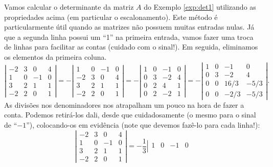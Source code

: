 \documentclass[../livro.tex]{subfiles}  %
\begin{document}
\begin{example}
Vamos calcular o determinante da matriz $A$ do Exemplo \ref{exp:det1} utilizando as propriedades acima (em particular o escalonamento). Este método é particularmente útil quando as matrizes não possuem muitas entradas nulas. Já que a segunda linha possui um ``1'' na primeira entrada, vamos fazer uma troca de linhas para facilitar as contas (cuidado com o sinal!). Em seguida, eliminamos os elementos da primeira coluna.
\begin{equation}
\left| \begin{matrix}
-2 & 3 & 0  & 4 \\
1  & 0 & -1 & 0 \\
3  & 2 & 1  & 1 \\
-2 & 2 & 0  & 1
\end{matrix}
\right| = -
\left| \begin{matrix}
1  & 0 & -1 & 0 \\
-2 & 3 & 0  & 4 \\
3  & 2 & 1  & 1 \\
-2 & 2 & 0  & 1
\end{matrix}
\right| = -
\left| \begin{matrix}
1  & 0 & -1 & 0 \\
0  & 3 & -2 & 4 \\
0  & 2 & 4  & 1 \\
0  & 2 & -2 & 1
\end{matrix}
\right| = -
\left| \begin{matrix}
1  & 0 & -1   & 0 \\
0  & 3 & -2   & 4 \\
0  & 0 & 16/3 & -5/3 \\
0  & 0 & -2/3 & -5/3
\end{matrix}
\right|.
\end{equation} As divisões nos denominadores nos atrapalham um pouco na hora de fazer a conta. Podemos retirá-los dali, desde que cuidadosamente (o mesmo para o sinal de ``$-1$''), colocando-os em evidência (note que devemos fazê-lo para cada linha!):
\begin{equation}
\left| \begin{matrix}
-2 & 3 & 0  & 4 \\
1  & 0 & -1 & 0 \\
3  & 2 & 1  & 1 \\
-2 & 2 & 0  & 1
\end{matrix}
\right| = -\frac{1}{3}
\left| \begin{matrix}
1  & 0 & -1   & 0 \\

\end{matrix}
\end{equation}
\end{example}
\end{document}
